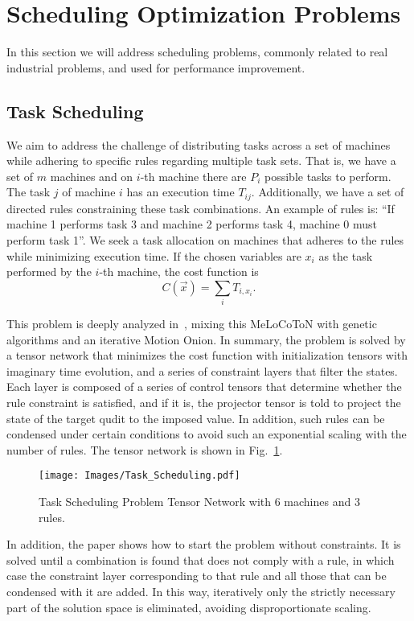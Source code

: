 \section{Scheduling Optimization Problems}
In this section we will address scheduling problems, commonly related to real industrial problems, and used for performance improvement.

\subsection{Task Scheduling}
We aim to address the challenge of distributing tasks across a set of machines while adhering to specific rules regarding multiple task sets. That is, we have a set of $m$ machines and on $i$-th machine there are $P_i$ possible tasks to perform. The task $j$ of machine $i$ has an execution time $T_{ij}$. Additionally, we have a set of directed rules constraining these task combinations. An example of rules is: “If machine 1 performs task 3 and machine 2 performs task 4, machine 0 must perform task 1”. We seek a task allocation on machines that adheres to the rules while minimizing execution time. If the chosen variables are $x_i$ as the task performed by the $i$-th machine, the cost function is
\begin{equation}
    C(\vec{x}) = \sum_i T_{i,x_i}.
\end{equation}

This problem is deeply analyzed in~\cite{Task_TN}, mixing this MeLoCoToN with genetic algorithms and an iterative Motion Onion. In summary, the problem is solved by a tensor network that minimizes the cost function with initialization tensors with imaginary time evolution, and a series of constraint layers that filter the states. Each layer is composed of a series of control tensors that determine whether the rule constraint is satisfied, and if it is, the projector tensor is told to project the state of the target qudit to the imposed value. In addition, such rules can be condensed under certain conditions to avoid such an exponential scaling with the number of rules. The tensor network is shown in Fig.~\ref{fig: Task Scheduling}.
\begin{figure}[h]
    \centering
    \texttt{[image: Images/Task\_Scheduling.pdf]}
    \caption{Task Scheduling Problem Tensor Network with 6 machines and 3 rules.}
    \label{fig: Task Scheduling}
\end{figure}

In addition, the paper shows how to start the problem without constraints. It is solved until a combination is found that does not comply with a rule, in which case the constraint layer corresponding to that rule and all those that can be condensed with it are added. In this way, iteratively only the strictly necessary part of the solution space is eliminated, avoiding disproportionate scaling.


